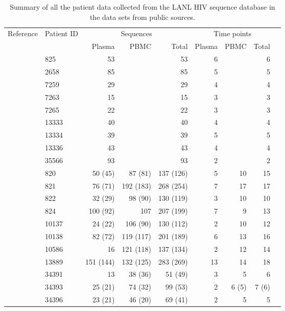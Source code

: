 \documentclass[12pt]{article}
\begin{document}
\begin{table*}
\caption{Summary of all the patient data collected from the LANL HIV sequence database \cite{LosAlamos} in the data sets from public sources.\label{tab:patients}}
\def\arraystretch{1.3}%
\begin{center}
\begin{tabular}{llrrrrrrr} 

Reference & Patient ID & \multicolumn{3}{c}{Sequences} & \multicolumn{3}{c}{Time points} \\
 &  & Plasma & PBMC & Total & Plasma & PBMC & Total\\
\hline
\cite{McCloskey14} & 825 & 53 & & 53 & 6 & & 6 \\
& 2658 & 85 & & 85 & 5 & & 5 \\
& 7259 & 29 & & 29 & 4 & & 4 \\
& 7263 & 15 & & 15 & 3 & & 3 \\
& 7265 & 22 & & 22 & 3 & & 3 \\
& 13333 & 40 & & 40 & 4 & & 4 \\
& 13334 & 39 & & 39 & 5 & & 5 \\
& 13336 & 43 & & 43 & 4 & & 4 \\
& 35566 & 93 & & 93 & 2 & & 2 \\
\hline
\cite{Shankarappa99} & 820 & 50 (45) & 87 (81) & 137 (126) & 5 & 10 & 15 \\
& 821 & 76 (71) & 192 (183) & 268 (254) & 7 & 17 & 17 \\ 
& 822 & 32 (29) & 98 (90) & 130 (119) & 3 & 10 & 10 \\ 
& 824 & 100 (92) & 107 & 207 (199) & 7 & 9 & 13 \\
& 10137 & 24 (22) & 106 (90) & 130 (112) & 2 & 10 & 12 \\
& 10138 & 82 (72) & 119 (117) & 201 (189) & 6 & 13 & 16 \\
& 10586 & 16 & 121 (118) & 137 (134) & 2 & 12 & 14 \\ 
& 13889 & 151 (144) & 132 (125) & 283 (269) & 13 & 14 & 18 \\
\cite{Novitsky09}%
& 34391 & 13 & 38 (36) & 51 (49) & 3 & 5 & 6 \\
& 34393 & 25 (21) & 74 (32) & 99 (53) & 2 & 6 (5) & 7 (6) \\
& 34396 & 23 (21) & 46 (20) & 69 (41) & 2 & 5 & 5 \\

\end{tabular}
\end{center}
\end{table*}
\end{document}

